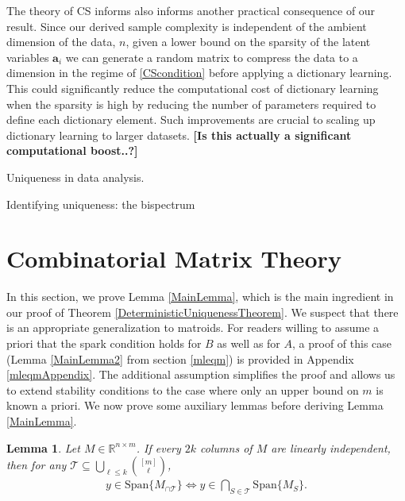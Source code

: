 \documentclass[journal, onecolumn]{IEEEtran}
\newtheorem{lemma}{Lemma}
\begin{document}
The theory of CS informs also informs another practical consequence of our result. Since our derived sample complexity is independent of the ambient dimension of the data, $n$, given a lower bound on the sparsity of the latent variables $\mathbf{a}_i$ we can generate a random matrix to compress the data to a dimension in the regime of \eqref{CScondition} before applying a dictionary learning. This could significantly reduce the computational cost of dictionary learning when the sparsity is high by reducing the number of parameters required to define each dictionary element. Such improvements are crucial to scaling up dictionary learning to larger datasets. \textbf{[Is this actually a significant computational boost..?]}

Uniqueness in data analysis.


Identifying uniqueness: the bispectrum


\appendices
\section{Combinatorial Matrix Theory}

In this section, we prove Lemma \ref{MainLemma}, which is the main ingredient in our proof of Theorem \ref{DeterministicUniquenessTheorem}. We suspect that there is an appropriate generalization to matroids. For readers willing to assume a priori that the spark condition holds for $B$ as well as for $A$, a proof of this case (Lemma \ref{MainLemma2} from section \ref{mleqm}) is provided in Appendix \ref{mleqmAppendix}. The additional assumption simplifies the proof and allows us to extend stability conditions to the case where only an upper bound on $m$ is known a priori. We now prove some auxiliary lemmas before deriving Lemma \ref{MainLemma}.


\begin{lemma}\label{SpanIntersectionLemma}
Let $M \in \mathbb{R}^{n \times m}$. If every $2k$ columns of $M$ are linearly independent, then for any $\mathcal{T} \subseteq \bigcup_{\ell \leq k} {[m] \choose \ell}$,
\begin{align}
y \in \text{Span}\{M_{\cap \mathcal{T}}\}  \Longleftrightarrow y \in \bigcap_{S \in \mathcal{T}} \text{Span}\{M_S\}.
\end{align}
\end{lemma}
\end{document}
